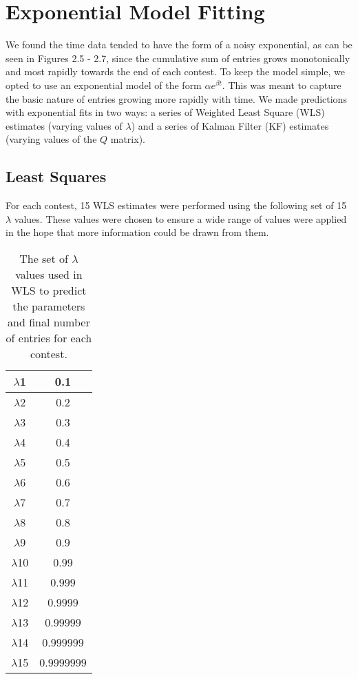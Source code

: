\section{Exponential Model Fitting}

We found the time data tended to have the form of a noisy exponential, as can be seen in Figures 2.5 - 2.7, since the cumulative sum of entries grows monotonically and most rapidly towards the end of each contest. To keep the model simple, we opted to use an exponential model of the form $\alpha e^{\beta t}$. This was meant to capture the basic nature of entries growing more rapidly with time. We made predictions with exponential fits in two ways: a series of Weighted Least Square (WLS) estimates (varying values of $\lambda$) and a series of Kalman Filter (KF) estimates (varying values of the $Q$ matrix).

\subsection{Least Squares}
For each contest, 15 WLS estimates were performed using the following set of 15 $\lambda$ values. These values were chosen to ensure a wide range of values were applied in the hope that more information could be drawn from them.

\begin{table}
\begin{center}
\begin{tabular}{| c | c |}
\hline
 $\lambda$1 & 0.1 \\  
 \hline
 $\lambda$2 & 0.2 \\  
 \hline
 $\lambda$3 & 0.3 \\  
 \hline
 $\lambda$4 & 0.4 \\  
 \hline
 $\lambda$5 & 0.5 \\  
 \hline
 $\lambda$6 & 0.6 \\  
 \hline
 $\lambda$7 & 0.7 \\  
 \hline
 $\lambda$8 & 0.8 \\  
 \hline
 $\lambda$9 & 0.9 \\  
 \hline
 $\lambda$10 & 0.99 \\  
 \hline
 $\lambda$11 & 0.999 \\  
 \hline
 $\lambda$12 & 0.9999 \\  
 \hline
 $\lambda$13 & 0.99999 \\  
 \hline
 $\lambda$14 & 0.999999 \\  
 \hline
 $\lambda$15 & 0.9999999 \\  
 \hline
\end{tabular}
\caption{The set of $\lambda$ values used in WLS to predict the parameters and final number of entries for each contest.}
\end{center}
\end{table}

